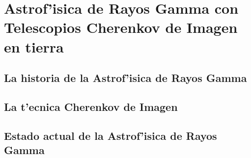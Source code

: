 
\chapter{Astrof'isica de Rayos Gamma con
  Telescopios Cherenkov de Imagen en tierra}
\label{chapter:iacts}

\section{La historia de la Astrof'isica de Rayos Gamma}

\section{La t'ecnica Cherenkov de Imagen}

\section{Estado actual de la Astrof'isica de Rayos Gamma}

\endinput
%

